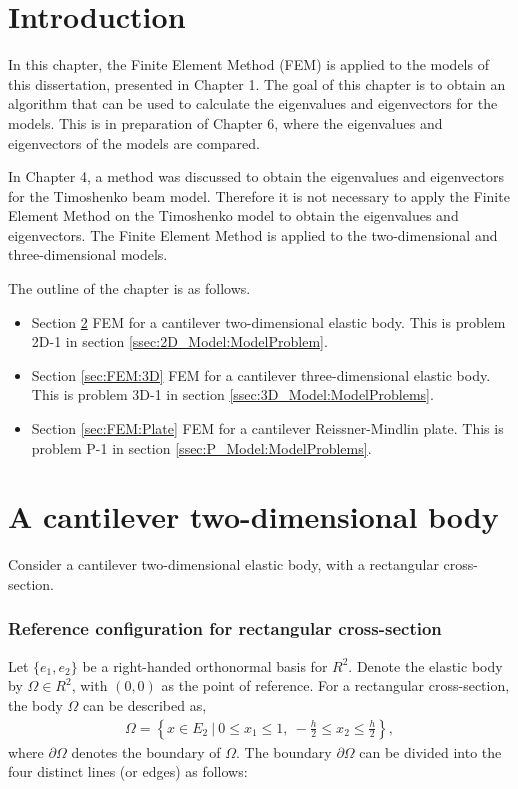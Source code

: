 \documentclass[../../main.tex]{subfiles}
\begin{document}
\section{Introduction}
In this chapter, the Finite Element Method (FEM) is applied to the models of this dissertation, presented in Chapter 1. The goal of this chapter is to obtain an algorithm that can be used to calculate the eigenvalues and eigenvectors for the models. This is in preparation of Chapter 6, where the eigenvalues and eigenvectors of the models are compared.

In Chapter 4, a method was discussed to obtain the eigenvalues and eigenvectors for the Timoshenko beam model. Therefore it is not necessary to apply the Finite Element Method on the Timoshenko model to obtain the eigenvalues and eigenvectors. The Finite Element Method is applied to the two-dimensional and three-dimensional models.

The outline of the chapter is as follows.
\begin{itemize}
	\item[] Section \ref{sec:FEM:2D} FEM for a cantilever two-dimensional elastic body. This is problem 2D-1 in section \ref{ssec:2D_Model:ModelProblem}.
	\item[] Section \ref{sec:FEM:3D} FEM for a cantilever three-dimensional elastic body. This is problem 3D-1 in section \ref{ssec:3D_Model:ModelProblems}.
	\item[] Section \ref{sec:FEM:Plate} FEM for a cantilever Reissner-Mindlin plate. This is problem P-1 in section \ref{ssec:P_Model:ModelProblems}.
\end{itemize}

\section{A cantilever two-dimensional body} \label{sec:FEM:2D}
Consider a cantilever two-dimensional elastic body, with a rectangular cross-section.

\subsubsection{Reference configuration for rectangular cross-section}\label{sssec:2D_Model:RefConf}
Let $\{e_1,e_2\}$ be a right-handed orthonormal basis for $R^2$. Denote the elastic body by $\Omega \in R^2$, with $(0,0)$ as the point of reference. For a rectangular cross-section, the body $\Omega$ can be described as,
\begin{eqnarray*}
	\Omega = \left \{ x \in E_2 \ | \ 0 \leq x_1 \leq 1, \ -\frac{h}{2} \leq x_2 \leq \frac{h}{2} \right \},
\end{eqnarray*} where $\partial \Omega$ denotes the boundary of $\Omega$. The boundary $\partial \Omega$ can be divided into the four distinct lines (or edges) as follows: \label{sym:En}
\end{document}
